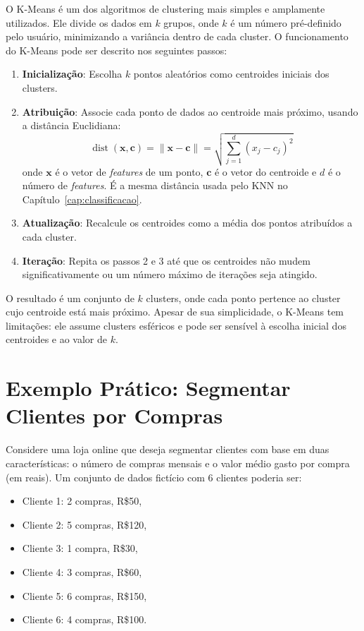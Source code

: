 \documentclass[a4paper,12pt,openany]{book}
\begin{document}
O K-Means é um dos algoritmos de clustering mais simples e amplamente utilizados. Ele divide os dados em \(k\) grupos, onde \(k\) é um número pré-definido pelo usuário, minimizando a variância dentro de cada cluster. O funcionamento do K-Means pode ser descrito nos seguintes passos:

\begin{enumerate}
    \item \textbf{Inicialização}: Escolha \(k\) pontos aleatórios como centroides iniciais dos clusters.
    \item \textbf{Atribuição}: Associe cada ponto de dados ao centroide mais próximo, usando a distância Euclidiana:
    \begin{equation}
    \operatorname{dist}(\mathbf{x}, \mathbf{c}) = \|\mathbf{x} - \mathbf{c}\| = \sqrt{\sum_{j=1}^{d} (x_j - c_j)^2}
    \end{equation}
    onde \(\mathbf{x}\) é o vetor de \textit{features} de um ponto, \(\mathbf{c}\) é o vetor do centroide e \(d\) é o número de \textit{features}. É a mesma distância usada pelo KNN no Capítulo~\ref{cap:classificacao}.
    \item \textbf{Atualização}: Recalcule os centroides como a média dos pontos atribuídos a cada cluster.
    \item \textbf{Iteração}: Repita os passos 2 e 3 até que os centroides não mudem significativamente ou um número máximo de iterações seja atingido.
\end{enumerate}

O resultado é um conjunto de \(k\) clusters, onde cada ponto pertence ao cluster cujo centroide está mais próximo. Apesar de sua simplicidade, o K-Means tem limitações: ele assume clusters esféricos e pode ser sensível à escolha inicial dos centroides e ao valor de \(k\).

\section{Exemplo Prático: Segmentar Clientes por Compras}

Considere uma loja online que deseja segmentar clientes com base em duas características: o número de compras mensais e o valor médio gasto por compra (em reais). Um conjunto de dados fictício com 6 clientes poderia ser:
\begin{itemize}
    \item Cliente 1: 2 compras, R\$50,
    \item Cliente 2: 5 compras, R\$120,
    \item Cliente 3: 1 compra, R\$30,
    \item Cliente 4: 3 compras, R\$60,
    \item Cliente 5: 6 compras, R\$150,
    \item Cliente 6: 4 compras, R\$100.
\end{itemize}
\end{document}
